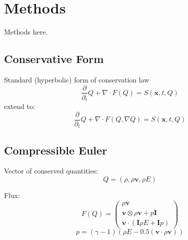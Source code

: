\chapter{Methods}
Methods here.

\newcommand{\Qrho}{\ensuremath{\rho}}
\newcommand{\Qj}{\ensuremath{\rho \bm{v}}}
\newcommand{\Qv}{\ensuremath{\bm{v}}}
\newcommand{\QE}{\ensuremath{\rho E}}
\newcommand{\stressT}{\ensuremath{\bm{\sigma}}}
\newcommand{\pressure}{\ensuremath{p}}
\newcommand{\maxConvEigen}{\ensuremath{\vert \lambda_c^{\text{max}} \vert}}
\newcommand{\maxViscEigen}{\ensuremath{\vert \lambda_v^{\text{max}} \vert}}

\section{Conservative Form}
Standard (hyperbolic) form of conservation law
\begin{equation}
  \label{eq:conservation-law}
 \frac{\partial}{\partial_t}  Q + \nabla \cdot F(Q) = S(\bm{x}, t, Q)
\end{equation}
extend to:
\begin{equation}
  \label{eq:conservation-law}
 \frac{\partial}{\partial_t}  Q + \nabla \cdot F(Q, \nabla Q) = S(\bm{x}, t, Q)
\end{equation}

\section{Compressible Euler}
Vector of conserved quantities:
\begin{equation}
  \label{eq:conserved-variables}
 Q = \left( \Qrho, \Qj, \QE \right) 
\end{equation}

\newcommand{\eulerFlux}{%
  \begin{pmatrix}
    \Qj \\
    \Qv  \otimes \Qj + \pressure \bm{I}  \\
    \Qv \cdot (\bm{I} \QE + \bm{I} \pressure)
  }
Flux:
\begin{equation}
  F(Q) = \eulerFlux
  \end{pmatrix}
\end{equation}
\begin{equation}
  \pressure = (\gamma - 1) \left(\QE - 0.5 \left(\Qv \cdot \Qj \right) \right)
\end{equation}

